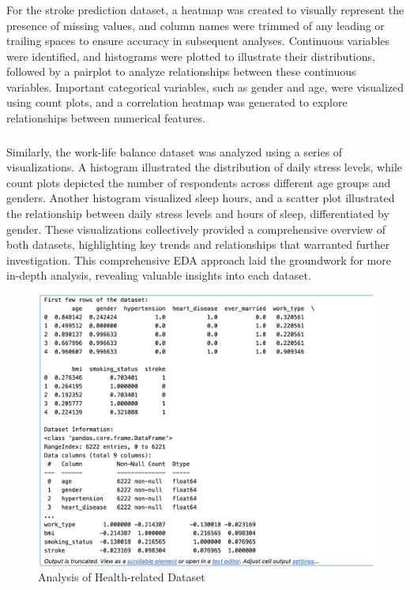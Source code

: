 \documentclass[runningheads]{llncs}
\begin{document}
\begin{enumerate}
\subsubsection{}
For the stroke prediction dataset, a heatmap was created to visually represent the presence of missing values, and column names were trimmed of any leading or trailing spaces to ensure accuracy in subsequent analyses. Continuous variables were identified, and histograms were plotted to illustrate their distributions, followed by a pairplot to analyze relationships between these continuous variables. Important categorical variables, such as gender and age, were visualized using count plots, and a correlation heatmap was generated to explore relationships between numerical features. 

\subsubsection{}
Similarly, the work-life balance dataset was analyzed using a series of visualizations. A histogram illustrated the distribution of daily stress levels, while count plots depicted the number of respondents across different age groups and genders. Another histogram visualized sleep hours, and a scatter plot illustrated the relationship between daily stress levels and hours of sleep, differentiated by gender. These visualizations collectively provided a comprehensive overview of both datasets, highlighting key trends and relationships that warranted further investigation. This comprehensive EDA approach laid the groundwork for more in-depth analysis, revealing valuable insights into each dataset.

\begin{figure}
    \centering
    \includegraphics[width=.8\linewidth]{eda.png}
    \caption{Analysis of Health-related Dataset} 
    \label{fig:enter-label}
\end{figure}


\end{enumerate}
\end{document}
